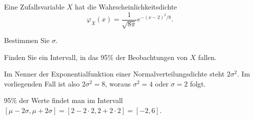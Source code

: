 Eine Zufallsvariable $X$ hat die Wahrscheinlichkeitsdichte
\[
\varphi_X(x)
=
\frac{1}{\!\sqrt{8\pi}}
e^{-(x-2)^2/8}.
\]
\begin{teilaufgaben}
\item
Bestimmen Sie $\sigma$.
\item
Finden Sie ein Intervall, in das 95\%{} der Beobachtungen von $X$
fallen.
\end{teilaufgaben}

\begin{loesung}
\begin{teilaufgaben}
\item
Im Nenner der Exponentialfunktion einer Normalverteilungsdichte
steht $2\sigma^2$.
Im vorliegenden Fall ist also $2\sigma^2=8$, woraus $\sigma^2=4$ oder
$\sigma=2$ folgt.
\item
95\% der Werte findet man im Intervall $[\mu-2\sigma,\mu+2\sigma]=
[2-2\cdot 2,2+2\cdot 2]=[-2,6]$.
\qedhere
\end{teilaufgaben}
\end{loesung}

